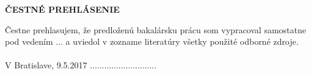 
\newpage
\thispagestyle{plain}
\vspace*{13cm} 
\begin{large}
\noindent
\textbf{ČESTNÉ PREHLÁSENIE} \\
\end{large}
\noindent
Čestne prehlasujem, že predloženú bakalársku prácu som vypracoval samostatne pod vedením
... a uviedol v zozname literatúry všetky použité odborné zdroje.\\
\vspace*{0.5cm}\\
V Bratislave, 9.5.2017
\hspace*{7cm}............................\\
\hspace*{10.8cm} \Author